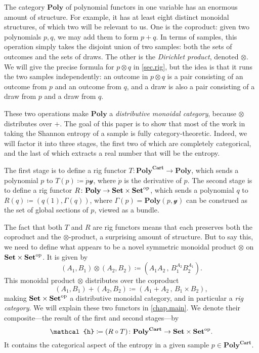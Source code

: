 \documentclass[11pt, one side, article]{memoir}
\theoremstyle{definition}
\theoremstyle{plain}
\newcommand{\Cat}[1]{\mathbf{#1}}%
\newcommand{\op}{^\tn{op}}
\newcommand{\tn}[1]{\textnormal{#1}}
\newcommand{\smset}{\Cat{Set}}
\newcommand{\yon}{\mathcal{y}}
\newcommand{\poly}{\Cat{Poly}}
\newcommand{\polycart}{\poly^{\Cat{Cart}}}
\newcommand{\hh}{\mathcal{h}}
\newcommand{\0}{\textsf{0}}
\newcommand{\1}{\tn{\textsf{1}}}
\newcommand{\R}{R}
\newcommand{\T}{T}
\begin{document}
The category $\poly$ of polynomial functors in one variable has an enormous amount of structure. For example, it has at least eight distinct monoidal structures, of which two will be relevant to us. One is the coproduct: given two polynomials $p,q$, we may add them to form $p+q$. In terms of samples, this operation simply takes the disjoint union of two samples: both the sets of outcomes and the sets of draws. The other is the \emph{Dirichlet product}, denoted $\otimes$. We will give the precise formula for $p\otimes q$ in \cref{sec.rig}, but the idea is that it runs the two samples independently: an outcome in $p\otimes q$ is a pair consisting of an outcome from $p$ and an outcome from $q$, and a draw is also a pair consisting of a draw from $p$ and a draw from $q$.

These two operations make $\poly$ a \emph{distributive monoidal category}, because $\otimes$ distributes over $+$. The goal of this paper is to show that most of the work in taking the Shannon entropy of a sample is fully category-theoretic. Indeed, we will factor it into three stages, the first two of which are completely categorical, and the last of which extracts a real number that will be the entropy. 

The first stage is to define a rig functor $\T\colon\polycart\to\poly$, which sends a polynomial $p$ to $\T(p)\coloneqq\dot{p}\yon$, where $\dot{p}$ is the derivative of $p$. The second stage is to define a rig functor $\R\colon\poly\to\smset\times\smset\op$, which sends a polynomial $q$ to $\R(q)\coloneqq(q(1),\Gamma(q))$, where $\Gamma(p)=\poly(p,\yon)$ can be construed as the set of global sections of $p$, viewed as a bundle. 

The fact that both $\T$ and $\R$ are rig functors means that each preserves both the coproduct and the $\otimes$-product, a surprising amount of structure. But to say this, we need to define what appears to be a novel symmetric monoidal product $\otimes$ on $\smset\times\smset\op$. It is given by
\[
	(A_1,B_1)\otimes(A_2,B_2)\coloneqq\left(A_1A_2\,,\,B_1^{A_2}B_2^{A_1}\right).
\]
This monoidal product $\otimes$ distributes over the coproduct
\[
(A_1,B_1)+(A_2,B_2)\coloneqq\left(A_1+A_2\,,\,B_1\times B_2\right),
\]
making $\smset\times\smset\op$ a distributive monoidal category, and in particular a \emph{rig category}. We will explain these two functors in \cref{chap.main}. We denote their composite---the result of the first and second stages---by
\[\hh\coloneqq(\R\circ\T)\colon\polycart\to\smset\times\smset\op.\]
It contains the categorical aspect of the entropy in a given sample $p\in\polycart$.
\end{document}

